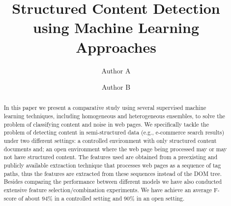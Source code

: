 \documentclass[sigconf,10pt]{acmart}
\begin{document}
\acmDOI{}\acmISBN{}

\fancyhead{}

\title{Structured Content Detection using Machine Learning Approaches}



\author{Author A}

\author{Author B}

\begin{abstract}
    In this paper we present a comparative study using several supervised 
    machine learning techniques, including homogeneous and heterogeneous
    ensembles, to solve the problem of classifying content and noise in web
    pages. We specifically tackle the problem of detecting content in 
    semi-structured data (e.g., e-commerce 
    search results) under two different
    settings: a controlled environment with only structured content documents
    and; an open environment where the web page being processed may or may
    not have structured content.
    The features used are obtained from a preexisting and publicly available extraction 
    technique that processes web pages as a sequence of tag paths, thus 
    the features are extracted from these sequences instead of the DOM 
    tree. Besides comparing the performance between different models 
    we have also conducted extensive feature selection/combination 
    experiments. We have achieve an average F-score of about
    94\% in a controlled setting and 90\% in an open setting.
\end{abstract}
\end{document}
